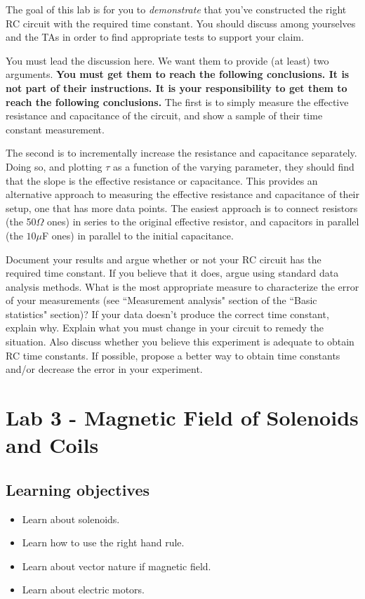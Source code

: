 \documentclass[12pt]{report}
\begin{document}
{\color{blue}The goal of this lab is for you to \textit{demonstrate} that you've constructed the right RC circuit with the required time constant. 
You should discuss among yourselves and the TAs in order to find appropriate tests to support your claim.}

\begin{tcolorbox}
You must lead the discussion here. We want them to provide (at least) two arguments. \textbf{You must get them to reach the following conclusions. It is not part of their instructions. It is your responsibility to get them to reach the following conclusions.} The first is to simply measure the effective resistance and capacitance of the circuit, and show a sample of their time constant measurement.
\end{tcolorbox}
\begin{tcolorbox}
The second is to incrementally increase the resistance and capacitance separately. 
Doing so, and plotting $\tau$ as a function of the varying parameter, they should find that the slope is the effective resistance or capacitance.
This provides an alternative approach to measuring the effective resistance and capacitance of their setup, one that has more data points. The easiest approach is to connect resistors (the 50$\Omega$ ones) in series to the original effective resistor, and capacitors in parallel (the $10\mu$F ones) in parallel to the initial capacitance.
\end{tcolorbox}

{\color{blue}Document your results and argue whether or not your RC circuit has the required time constant. If you believe that it does, argue using standard data analysis methods. What is the most appropriate measure to characterize the error of your measurements (see ``Measurement analysis" section of the ``Basic statistics" section)? If your data doesn't produce the correct time constant, explain why. Explain what you must change in your circuit to remedy the situation. Also discuss whether you believe this experiment is adequate to obtain RC time constants. If possible, propose a better way to obtain time constants and/or decrease the error in your experiment.}


\chapter{Lab 3 - Magnetic Field of Solenoids and Coils}
\section{Learning objectives}
\begin{itemize}
\item Learn about solenoids.
\item Learn how to use the right hand rule.
\item Learn about vector nature if magnetic field.
\item Learn about electric motors.
\end{itemize}
\end{document}
